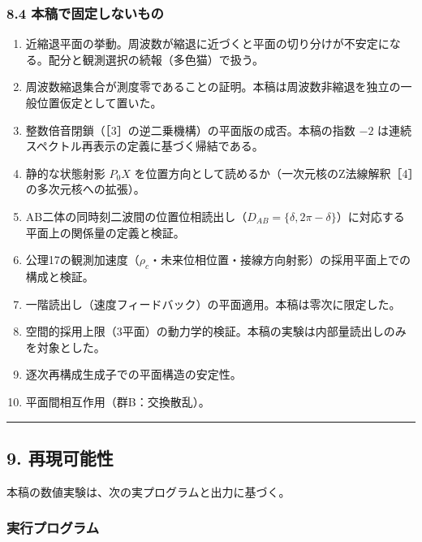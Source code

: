 \documentclass[
  a4paper,
]{ltjsarticle}
\providecommand{\tightlist}{%
  \setlength{\itemsep}{0pt}\setlength{\parskip}{0pt}}
\begin{document}
\subsubsection{8.4
本稿で固定しないもの}\label{ux672cux7a3fux3067ux56faux5b9aux3057ux306aux3044ux3082ux306e}

\begin{enumerate}
\def\labelenumi{\arabic{enumi}.}
\tightlist
\item
  近縮退平面の挙動。周波数が縮退に近づくと平面の切り分けが不安定になる。配分と観測選択の続報（多色猫）で扱う。
\item
  周波数縮退集合が測度零であることの証明。本稿は周波数非縮退を独立の一般位置仮定として置いた。
\item
  整数倍音閉鎖（［3］の逆二乗機構）の平面版の成否。本稿の指数 \(-2\)
  は連続スペクトル再表示の定義に基づく帰結である。
\item
  静的な状態射影 \(P_0X\)
  を位置方向として読めるか（一次元核のZ法線解釈［4］の多次元核への拡張）。
\item
  AB二体の同時刻二波間の位置位相読出し（\(D_{AB}=\{\delta,2\pi-\delta\}\)）に対応する平面上の関係量の定義と検証。
\item
  公理17の観測加速度（\(\rho_c\)・未来位相位置・接線方向射影）の採用平面上での構成と検証。
\item
  一階読出し（速度フィードバック）の平面適用。本稿は零次に限定した。
\item
  空間的採用上限（3平面）の動力学的検証。本稿の実験は内部量読出しのみを対象とした。
\item
  逐次再構成生成子での平面構造の安定性。
\item
  平面間相互作用（群B：交換散乱）。
\end{enumerate}

\begin{center}\rule{0.5\linewidth}{0.5pt}\end{center}

\subsection{9. 再現可能性}\label{ux518dux73feux53efux80fdux6027}

本稿の数値実験は、次の実プログラムと出力に基づく。

\subsubsection{実行プログラム}\label{ux5b9fux884cux30d7ux30edux30b0ux30e9ux30e0}
\end{document}
